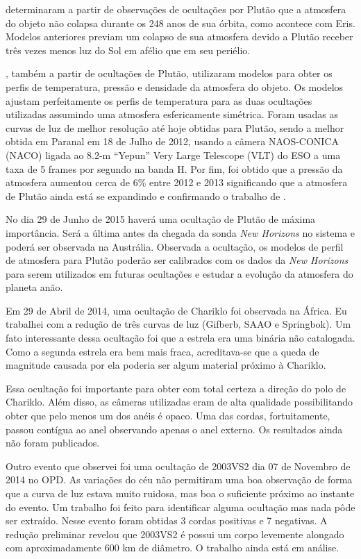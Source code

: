 \documentclass[12pt,a4paper]{monografia}
\begin{document}
\cite{Olkin2015} determinaram a partir de observações de ocultações por Plutão que a atmosfera do objeto não colapsa durante os 248 anos de sua órbita, como acontece com Eris. Modelos anteriores previam um colapso de sua atmosfera devido a Plutão receber três vezes menos luz do Sol em afélio que em seu periélio.

\cite{DiasOliveira2015}, também a partir de ocultações de Plutão, utilizaram modelos para obter os perfis de temperatura, pressão e densidade da atmosfera do objeto. Os modelos ajustam perfeitamente os perfis de temperatura para as duas ocultações utilizadas assumindo uma atmosfera esfericamente simétrica. Foram usadas as curvas de luz de melhor resolução até hoje obtidas para Plutão, sendo a melhor obtida em  Paranal em 18 de Julho de 2012, usando a câmera NAOS-CONICA (NACO) ligada ao 8.2-m “Yepun” Very Large Telescope (VLT) do ESO a uma taxa de 5 frames por segundo na banda H. Por fim, foi obtido que a pressão da atmosfera aumentou cerca de 6\% entre 2012 e 2013 significando que a atmosfera de Plutão ainda está se expandindo e confirmando o trabalho de \cite{Olkin2015}.

No dia 29 de Junho de 2015 haverá uma ocultação de Plutão de máxima importância. Será a última antes da chegada da sonda \textit{New Horizons} no sistema e poderá ser observada na Austrália. Observada a ocultação, os modelos de perfil de atmosfera para Plutão poderão ser calibrados com os dados da \textit{New Horizons} para serem utilizados em futuras ocultações e estudar a evolução da atmosfera do planeta anão.

Em 29 de Abril de 2014, uma ocultação de Chariklo foi observada na África. Eu trabalhei com a redução de três curvas de luz (Gifberb, SAAO e Springbok). Um fato interessante dessa ocultação foi que a estrela era uma binária não catalogada. Como a segunda estrela era bem mais fraca, acreditava-se que a queda de magnitude causada por ela poderia ser algum material próximo à Chariklo.

Essa ocultação foi importante para obter com total certeza a direção do polo de Chariklo. Além disso, as câmeras utilizadas eram de alta qualidade possibilitando obter que pelo menos um dos anéis é opaco. Uma das cordas, fortuitamente, passou contígua ao anel observando apenas o anel externo. Os resultados ainda não foram publicados.

Outro evento que observei foi uma ocultação de 2003VS2 dia 07 de Novembro de 2014 no OPD. As variações do céu não permitiram uma boa observação de forma que a curva de luz estava muito ruidosa, mas boa o suficiente próximo ao instante do evento. Um trabalho foi feito para identificar alguma ocultação mas nada pôde ser extraído. Nesse evento foram obtidas 3 cordas positivas e 7 negativas. A redução preliminar revelou que 2003VS2 é possui um corpo levemente alongado com aproximadamente 600 km de diâmetro. O trabalho ainda está em análise.
\end{document}
